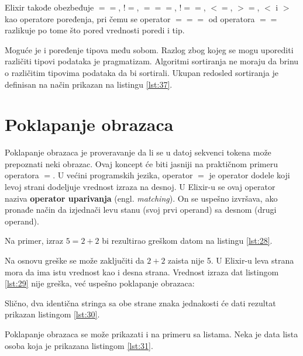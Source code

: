\documentclass[12pt,oneside]{memoir}
\begin{document}
Elixir takođe obezbeđuje $==$, ${!}{=}$, $===$, ${!}{=}{=}$, $<=$, $>=$, $<$ i $>$ kao operatore poređenja, pri čemu se operator $===$ od operatora $==$ razlikuje po tome što pored vrednosti poredi i tip.

Moguće je i poređenje tipova među sobom. Razlog zbog kojeg se mogu uporediti različiti tipovi podataka je pragmatizam. Algoritmi sortiranja ne moraju da brinu o različitim tipovima podataka da bi sortirali. Ukupan redosled sortiranja je definisan na način prikazan na listingu \ref{lst:37}.



\section{Poklapanje obrazaca}

Poklapanje obrazaca je proveravanje da li se u datoj sekvenci tokena može prepoznati neki obrazac. Ovaj koncept će biti jasniji na praktičnom primeru operatora $=$. U većini programskih jezika, operator $=$ je operator dodele koji levoj strani dodeljuje vrednost izraza na desnoj. U Elixir-u se ovaj operator naziva \textbf{operator uparivanja} (engl. \textit{matching}). On se uspešno izvršava, ako pronađe način da izjednači levu stanu (svoj prvi operand) sa desnom (drugi operand).

Na primer, izraz $5 = 2 + 2$ bi rezultirao greškom datom na listingu \ref{lst:28}.



Na osnovu greške se može zaključiti da $2 + 2$ zaista nije 5. U Elixir-u leva strana mora da ima istu vrednost kao i desna strana. Vrednost izraza dat listingom \ref{lst:29} nije greška, već uspešno poklapanje obrazaca:



Slično, dva identična stringa sa obe strane znaka jednakosti će dati rezultat prikazan listingom \ref{lst:30}.



Poklapanje obrazaca se može prikazati i na primeru sa listama. Neka je data lista osoba koja je prikazana listingom \ref{lst:31}.
\end{document}
